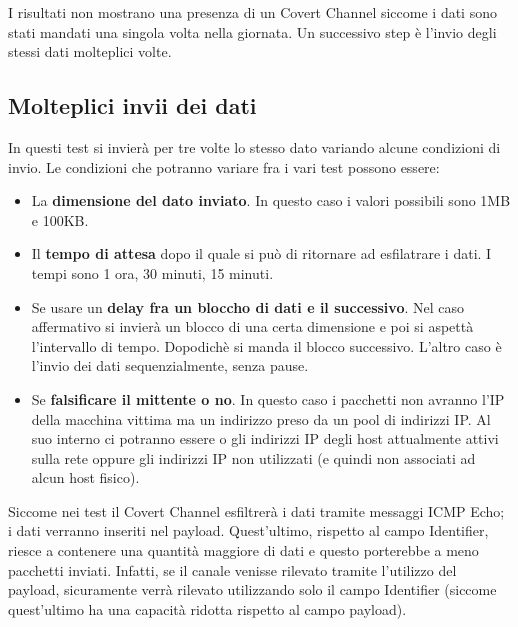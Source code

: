 I risultati non mostrano una presenza di un Covert Channel siccome i dati sono stati mandati una singola volta nella giornata. 
Un successivo step è l'invio degli stessi dati molteplici volte. 

\subsection{Molteplici invii dei dati} 
In questi test si invierà per tre volte lo stesso dato variando alcune condizioni di invio. 
Le condizioni che potranno variare fra i vari test possono essere: 
\begin{itemize}
    \item[] La \textbf{dimensione del dato inviato}. In questo caso i valori 
    possibili sono 1MB e 100KB. 
    \item[] Il \textbf{tempo di attesa} dopo il quale si può di ritornare 
    ad esfilatrare i dati. I tempi sono 1 ora, 30 minuti, 15 minuti. 
    \item[] Se usare un \textbf{delay fra un bloccho di dati e il successivo}. 
    Nel caso affermativo si invierà un blocco di una certa dimensione e poi 
    si aspettà l'intervallo di tempo. Dopodichè si manda il blocco successivo. 
    L'altro caso è l'invio dei dati sequenzialmente, senza pause. 
    \item[] Se \textbf{falsificare il mittente o no}. In questo caso i pacchetti 
    non avranno l'IP della macchina vittima ma un indirizzo preso da un pool 
    di indirizzi IP. Al suo interno ci potranno essere o gli indirizzi IP 
    degli host attualmente attivi sulla rete oppure gli indirizzi IP non 
    utilizzati (e quindi non associati ad alcun host fisico). 
\end{itemize} 
Siccome nei test il Covert Channel esfiltrerà i dati tramite messaggi ICMP Echo; i dati verranno inseriti nel payload. 
Quest'ultimo, rispetto al campo Identifier, riesce a contenere una quantità maggiore di dati e questo porterebbe a meno pacchetti inviati. 
Infatti, se il canale venisse rilevato tramite l'utilizzo del payload, sicuramente verrà rilevato utilizzando solo il campo Identifier 
(siccome quest'ultimo ha una capacità ridotta rispetto al campo payload).  
\vspace{4ex} 
